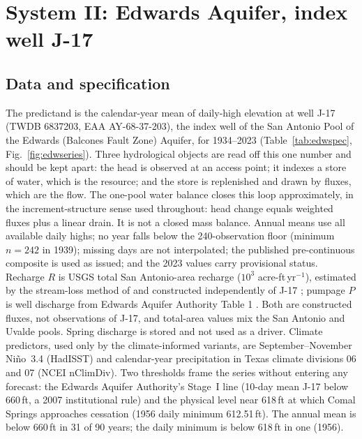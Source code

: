 \FloatBarrier
\section{System II: Edwards Aquifer, index well J-17}\label{sec:edwards}

\subsection{Data and specification}\label{sec:edw_data}

The predictand is the calendar-year mean of daily-high elevation at well J-17 (TWDB 6837203, EAA AY-68-37-203), the index well of the San Antonio Pool of the Edwards (Balcones Fault Zone) Aquifer, for 1934--2023 (Table~\ref{tab:edwspec}, Fig.~\ref{fig:edwseries}). Three hydrological objects are read off this one number and should be kept apart: the head is observed at an access point; it indexes a store of water, which is the resource; and the store is replenished and drawn by fluxes, which are the flow. The one-pool water balance closes this loop approximately, in the increment-structure sense used throughout: head change equals weighted fluxes plus a linear drain. It is not a closed mass balance. Annual means use all available daily highs; no year falls below the 240-observation floor (minimum $n=242$ in 1939); missing days are not interpolated; the published pre-continuous composite is used as issued; and the 2023 values carry provisional status. Recharge $R$ is USGS total San Antonio-area recharge ($10^3$ acre-ft\,yr$^{-1}$), estimated by the stream-loss method of \citet{Puente1978} and constructed independently of J-17 \citep{UmphresChoi2025}; pumpage $P$ is well discharge from Edwards Aquifer Authority Table 1 \citep{EAA2024}. Both are constructed fluxes, not observations of J-17, and total-area values mix the San Antonio and Uvalde pools. Spring discharge is stored and not used as a driver. Climate predictors, used only by the climate-informed variants, are September--November Ni\~no~3.4 (HadISST) and calendar-year precipitation in Texas climate divisions 06 and 07 (NCEI nClimDiv). Two thresholds frame the series without entering any forecast: the Edwards Aquifer Authority's Stage~I line (10-day mean J-17 below 660\,ft, a 2007 institutional rule) and the physical level near 618\,ft at which Comal Springs approaches cessation (1956 daily minimum 612.51\,ft). The annual mean is below 660\,ft in 31 of 90 years; the daily minimum is below 618\,ft in one (1956).

